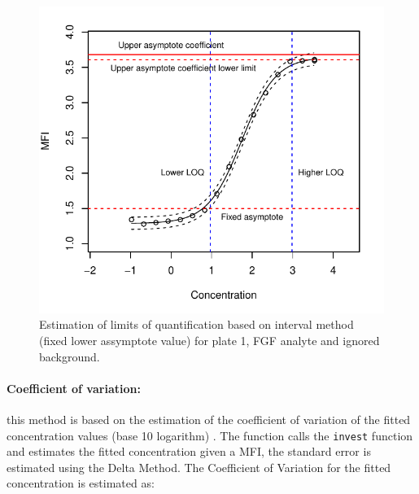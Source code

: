 \documentclass[11pt]{article}\usepackage[]{graphicx}\usepackage[]{color}
\makeatletter
\def\maxwidth{ %
  \ifdim\Gin@nat@width>\linewidth
    \linewidth
  \else
    \Gin@nat@width
  \fi
}
\newenvironment{knitrout}{}{} %
\makeatother
\begin{document}
\begin{knitrout}
\color{fgcolor}\begin{figure}

{\centering \includegraphics[width=\maxwidth]{./loqint2-1} 

}

\caption[Estimation of limits of quantification based on interval method (fixed lower assymptote value) for plate 1, FGF analyte and ignored background]{Estimation of limits of quantification based on interval method (fixed lower assymptote value) for plate 1, FGF analyte and ignored background.}\label{fig:loqint2}
\end{figure}


\end{knitrout}



\paragraph{Coefficient of variation:} this method is based on the estimation of 
the coefficient of variation of the fitted concentration values 
(base 10 logarithm) \cite{Defawe,Gottschalk}. The function calls the {\tt invest} 
function and estimates the fitted concentration given a MFI, the standard error 
is estimated using the Delta Method. The Coefficient of Variation for the 
fitted concentration is estimated as:
\end{document}
